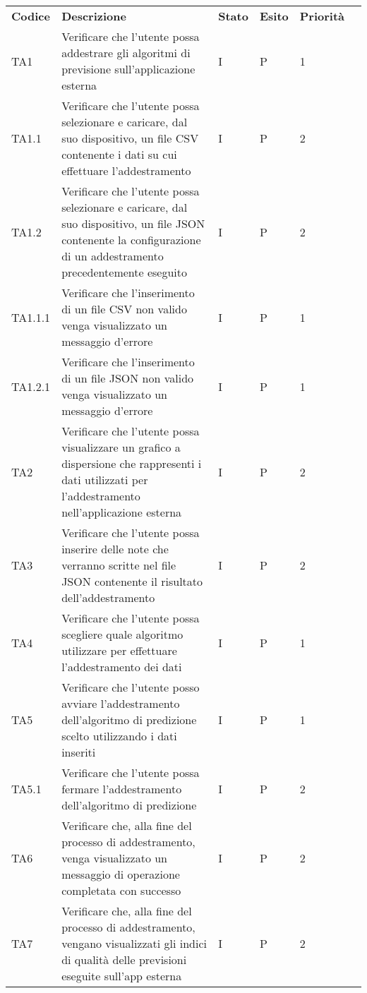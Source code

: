 \setcounter{table}{0}
\begin{longtable} {
	>{}p{12mm}
	>{}p{79.5mm}
	>{}p{9mm}
	>{}p{8mm}
	>{}p{14mm}
	>{}p{0mm}}
	\rowcolor{gray!50}
	\textbf{Codice} & \textbf{Descrizione} & \textbf{Stato} & \textbf{Esito} & \textbf{Priorità} & \TBstrut \\
	TA1 & Verificare che l'utente possa addestrare gli algoritmi di previsione sull'applicazione esterna & I & P & 1 & \TBstrut \\ [2mm]
	TA1.1 & Verificare che l'utente possa selezionare e caricare, dal suo dispositivo, un file CSV contenente i dati su cui effettuare l'addestramento & I & P & 2 & \TBstrut \\ [2mm]
	TA1.2 & Verificare che l'utente possa selezionare e caricare, dal suo dispositivo, un file JSON contenente la configurazione di un addestramento precedentemente eseguito & I & P & 2 & \TBstrut \\ [2mm]
	TA1.1.1 & Verificare che l'inserimento di un file CSV non valido venga visualizzato un messaggio d'errore & I & P & 1 & \TBstrut \\ [2mm]
	TA1.2.1 & Verificare che l'inserimento di un file JSON non valido venga visualizzato un messaggio d'errore & I & P & 1 & \TBstrut \\ [2mm]
	TA2 & Verificare che l'utente possa visualizzare un grafico a dispersione che rappresenti i dati utilizzati per l'addestramento nell'applicazione esterna & I & P & 2 & \TBstrut \\ [2mm]
	TA3 & Verificare che l'utente possa inserire delle note che verranno scritte nel file JSON contenente il risultato dell'addestramento & I & P & 2 & \TBstrut \\ [2mm]
	TA4 & Verificare che l'utente possa scegliere quale algoritmo utilizzare per effettuare l'addestramento dei dati & I & P & 1 & \TBstrut \\ [2mm]
	TA5 & Verificare che l'utente posso avviare l'addestramento dell'algoritmo di predizione scelto utilizzando i dati inseriti & I & P & 1 & \TBstrut \\ [2mm]
	TA5.1 & Verificare che l'utente possa fermare l'addestramento dell'algoritmo di predizione & I & P & 2 & \TBstrut \\ [2mm]
	TA6 & Verificare che, alla fine del processo di addestramento, venga visualizzato un messaggio di operazione completata con successo & I & P & 2 & \TBstrut \\ [2mm]
	TA7 & Verificare che, alla fine del processo di addestramento, vengano visualizzati gli indici di qualità delle previsioni eseguite sull'app esterna & I & P & 2 & \TBstrut \\ [2mm]

\end{longtable}
